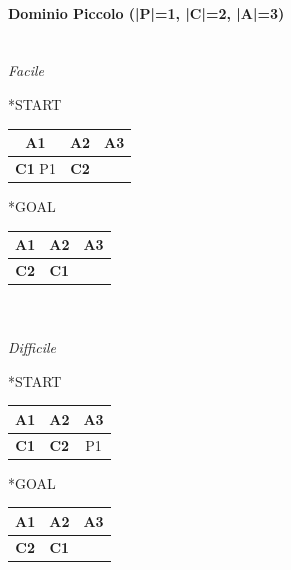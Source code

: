 \documentclass[a4paper,oneside,12pt]{book}
\begin{document}
    \paragraph*{Dominio Piccolo (|P|=1, |C|=2, |A|=3)\\\\}
    \noindent \textit{Facile\\}
    \begin{minipage}{0.45\textwidth}
        \begin{center}
            *{START}
            \begin{tabular}{|c | c| c |}
                \hline
                A1&A2&A3\\
                \hline
                \textbf{C1} P1&\textbf{C2}&\\
                \hline
            \end{tabular}
        \end{center}
    \end{minipage}%
    \begin{minipage}{0.45\textwidth}
        \begin{center}
            *{GOAL}
            \begin{tabular}{|c | c| c |}
                \hline
                A1&A2&A3\\
                \hline
                \textbf{C2}&\textbf{C1}&\\
                \hline
            \end{tabular}
        \end{center}
    \end{minipage}%

    \noindent \textit{ \\\\ Difficile\\}
    \begin{minipage}{0.45\textwidth}
        \begin{center}
            *{START}
            \begin{tabular}{|c | c| c |}
                \hline
                A1&A2&A3\\
                \hline
                \textbf{C1} &\textbf{C2}&P1\\
                \hline
            \end{tabular}
        \end{center}
    \end{minipage}%
    \begin{minipage}{0.45\textwidth}

        \begin{center}
            *{GOAL}
            \begin{tabular}{|c | c| c |}
                \hline
                A1&A2&A3\\
                \hline
                \textbf{C2}&\textbf{C1}&\\
                \hline
            \end{tabular}

        \end{center}
    \end{minipage}
\end{document}
